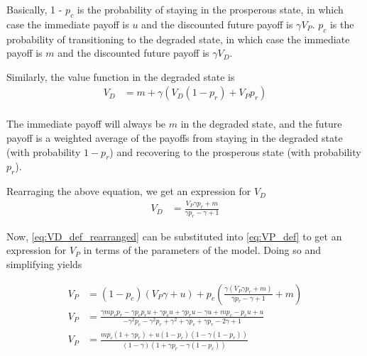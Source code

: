 \documentclass{article}
\begin{document}
Basically, 1 - $p_c$ is the probability of staying in the prosperous state, in which case the immediate payoff is $u$ and the discounted future payoff is $\gamma V_P$.
$p_c$ is the probability of transitioning to the degraded state, in which case the immediate payoff is $m$ and the discounted future payoff is $\gamma V_D$.

Similarly, the value function in the degraded state is
\begin{equation}
\label{eq:VD_def}
\begin{aligned}
V_{D} &=  m  + \gamma \left(V_{D} \left(1 - p_{r}\right) + V_{P} p_{r}\right) \\
\end{aligned}
\end{equation}

The immediate payoff will always be $m$ in the degraded state, and the future payoff is a weighted average of the payoffs from staying in the degraded state (with probability $1 - p_r$) and recovering to the prosperous state (with probability $p_r$).

Rearraging the above equation, we get an expression for $V_D$ 
\begin{equation}
\label{eq:VD_def_rearranged}
\begin{aligned}
V_{D} &= \frac{V_{P} \gamma p_{r} + m}{\gamma p_{r} - \gamma + 1}
\end{aligned}
\end{equation}


Now, \ref{eq:VD_def_rearranged} can be substituted into \ref{eq:VP_def} to get an expression for $V_P$ in terms of the parameters of the model.
Doing so and simplifying yields

\begin{equation}
\label{eq:VP_final}
\begin{aligned}
V_{P} &= \left(1 - p_{c}\right) \left(V_{P} \gamma + u\right) + p_{c} \left(\frac{\gamma \left(V_{P} \gamma p_{r} + m\right)}{\gamma p_{r} - \gamma + 1} + m\right) \\
V_{P} &= \frac{\gamma m p_{c} p_{r} - \gamma p_{c} p_{r} u + \gamma p_{c} u + \gamma p_{r} u - \gamma u + m p_{c} - p_{c} u + u}{- \gamma^{2} p_{c} - \gamma^{2} p_{r} + \gamma^{2} + \gamma p_{c} + \gamma p_{r} - 2 \gamma + 1} \\
V_{P} &= \frac{m p_{c} \left(1 + \gamma p_{r}\right) + u \left(1 - p_{c}\right) \left(1 - \gamma \left(1 - p_{r}\right)\right)}{\left(1 - \gamma\right) \left(1 + \gamma p_{r} - \gamma \left(1 - p_{c}\right) \right)}
\end{aligned}
\end{equation}
\end{document}
